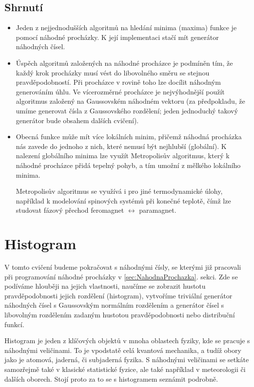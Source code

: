 \documentclass[a4paper,11pt,twoside]{article}
\theoremstyle{red}
\theoremstyle{green}
\begin{document}
\subsection{Shrnutí}
    \begin{itemize}
        \item 
            Jeden z nejjednodušších algoritmů na hledání minima (maxima) funkce je pomocí náhodné procházky.
            K její implementaci stačí mít generátor náhodných čísel.

        \item 
            Úspěch algoritmů založených na náhodné procházce je podmíněn tím, že každý krok procházky musí vést do libovolného směru se stejnou pravděpodobností.
            Při procházce v rovině toho lze docílit náhodným generováním úhlu.
            Ve vícerozměrné procházce je nejvýhodnější použít algoritmus založený na Gaussovském náhodném vektoru (za předpokladu, že umíme generovat čísla z Gaussovského rozdělení; jeden jednoduchý takový generátor bude obsahem dalších cvičení).   
        
        \item 
            Obecná funkce může mít více lokálních minim, přičemž náhodná procházka nás zavede do jednoho z nich, které nemusí být nejhlubší (globální).
            K nalezení globálního minima lze využít Metropolisův algoritmus, který k náhodné procházce přidá tepelný pohyb, a tím umožní  z mělkého lokálního minima.  

            Metropolisův algoritmus se využívá i pro jiné termodynamické úlohy, například k modelování spinových systémů při konečné teplotě, čímž lze studovat fázový přechod feromagnet $\leftrightarrow$ paramagnet.
    \end{itemize}


\section{Histogram}
    V tomto cvičení budeme pokračovat s náhodnými čísly, se kterými již pracovali při programování náhodné procházky v \ref{sec:NahodnaProchazka}. sekci.
    Zde se podíváme hlouběji na jejich vlastnosti, naučíme se zobrazit hustotu pravděpodobnosti jejich rozdělení (histogram), vytvoříme triviální generátor náhodných čísel s Gaussovským normálním rozdělením a generátor čísel s libovolným rozdělením zadaným hustotou pravděpodobnosti nebo distribuční funkcí.
       
    Histogram je jeden z klíčových objektů v mnoha oblastech fyziky, kde se pracuje s náhodnými veličinami.
    To je vpodstatě celá kvantová mechanika, a tudíž obory jako je atomová, jaderná, či subjaderná fyzika.
    S náhodnými veličinami se setkáte samozřejmě také v klasické statistické fyzice, ale také například v meteorologii či dalších oborech.
    Stojí proto za to se s histogramem seznámit podrobně.
\end{document}
